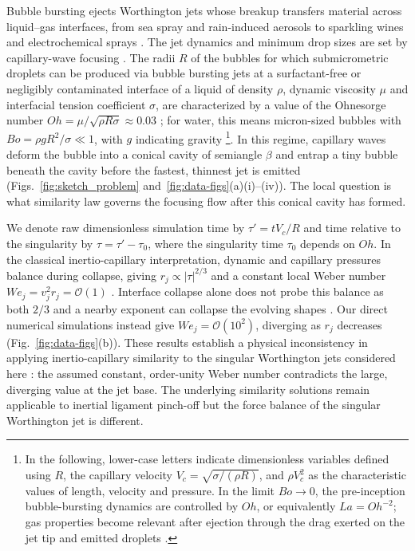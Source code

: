 \documentclass[aps,prl,reprint,floatfix]{revtex4-2}
\begin{document}
Bubble bursting ejects Worthington jets whose breakup transfers material across liquid--gas interfaces,
from sea spray \cite{MacIntyre,Bigg,PNAS,AnnRevDeike,PNASWang,Abyss} and rain-induced aerosols \cite{RainPorous} to sparkling wines
\cite{SeonLigerBelair2017} and electrochemical sprays \cite{Bashkatov2025}.
The jet dynamics and minimum drop sizes are set by capillary-wave focusing \cite{Blake1993,Duchemin,Walls2015,krishnan2017,PRFBird,Deike,Berny}. The radii $R$ of the bubbles for which submicrometric droplets can be produced via bubble bursting jets at a surfactant-free or negligibly contaminated interface of a liquid of density $\rho$, dynamic viscosity $\mu$ and interfacial tension coefficient $\sigma$, are characterized by a value of the Ohnesorge number $Oh=\mu/\sqrt{\rho R\sigma}\approx0.03$ \cite{Walls2015,PRFBird}; for water, this means micron-sized bubbles with $Bo=\rho gR^2/\sigma\ll1$, with $g$ indicating gravity \footnote{In the following, lower-case letters indicate dimensionless variables defined using $R$, the capillary velocity $V_c=\sqrt{\sigma/(\rho R)}$, and $\rho V_c^2$ as the characteristic values of length, velocity and pressure. In the limit $Bo\rightarrow0$, the pre-inception bubble-bursting dynamics are controlled by $Oh$, or equivalently $La=Oh^{-2}$; gas properties become relevant after ejection through the drag exerted on the jet tip and emitted droplets \cite{JFM2020,Tian2023}.}. In this regime, capillary waves deform the bubble into a conical cavity of semiangle $\beta$ and entrap a tiny bubble beneath the cavity before the fastest, thinnest jet is emitted \cite{JFM2019} (Figs.~\ref{fig:sketch_problem} and~\ref{fig:data-figs}(a)(i)--(iv)). The local question is what similarity law governs the focusing flow after this conical cavity has formed.

We denote raw dimensionless simulation time by $\tau'=tV_c/R$ and time relative to the singularity by $\tau=\tau'-\tau_0$, where the singularity time $\tau_0$ depends on $Oh$. In the classical inertio-capillary interpretation, dynamic and capillary pressures balance during collapse, giving $r_j\propto|\tau|^{2/3}$ and a constant local Weber number $We_j=v_j^2r_j=\mathcal{O}(1)$ \cite{Zeff,Duchemin,Sierou,PRLEggers,PRLCattaneo}. Interface collapse alone does not probe this balance as both $2/3$ and a nearby exponent can collapse the evolving shapes \cite{Zeff,PRLEggers,PRLCattaneo}. Our direct numerical simulations instead give $We_j=\mathcal{O}(10^2)$, diverging as $r_j$ decreases (Fig.~\ref{fig:data-figs}(b)). These results establish a physical inconsistency in applying inertio-capillary similarity to the singular Worthington jets considered here \cite{Ghabache,PRLGanan,PRFBird,Deike,PRLEggers,JFM2020,JFMGanan,Gananfinespray,PRLCattaneo,Eshima2026,JFM2026}: the assumed constant, order-unity Weber number contradicts the large, diverging value at the jet base. The underlying similarity solutions \cite{Zeff,Sierou} remain applicable to inertial ligament pinch-off but the force balance of the singular Worthington jet is different.
\end{document}
